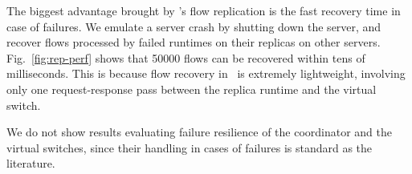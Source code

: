 The biggest advantage brought by \nfactor's flow replication is the fast recovery time in case of failures. %
We emulate a server crash by shutting down the server, and recover flows processed by failed runtimes on their replicas on other servers. Fig.~\ref{fig:rep-perf} shows that 50000 flows can be recovered within tens of milliseconds. This is because flow recovery in \nfactor~is extremely lightweight, involving only one request-response pass between the replica runtime and the virtual switch. %

We do not show results evaluating failure resilience of the coordinator and the virtual switches, since their handling in cases of failures is standard as the literature.



